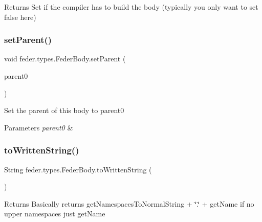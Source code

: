 \begin{DoxyReturn}{Returns}
Set if the compiler has to build the body (typically you only want to set \textquotesingle{}false\textquotesingle{} here) 
\end{DoxyReturn}
\mbox{\label{classfeder_1_1types_1_1FederBody_a0c773c1b19c9fb19e27270674ebd54e0}} 
\subsubsection{\texorpdfstring{set\+Parent()}{setParent()}}
{\footnotesize\ttfamily void feder.\+types.\+Feder\+Body.\+set\+Parent (\begin{DoxyParamCaption}\item[{\hyperlink{classfeder_1_1types_1_1FederBody}{Feder\+Body}}]{parent0 }\end{DoxyParamCaption})}

Set the parent of this body to \textquotesingle{}parent0\textquotesingle{} 
\begin{DoxyParams}{Parameters}
{\em parent0} & \\
\hline
\end{DoxyParams}
\mbox{\label{classfeder_1_1types_1_1FederBody_ab31ab3308f48585665e6367f776c1d71}} 
\subsubsection{\texorpdfstring{to\+Written\+String()}{toWrittenString()}}
{\footnotesize\ttfamily String feder.\+types.\+Feder\+Body.\+to\+Written\+String (\begin{DoxyParamCaption}{ }\end{DoxyParamCaption})}

\begin{DoxyReturn}{Returns}
Basically returns get\+Namespaces\+To\+Normal\+String + \char`\"{}.\char`\"{} + get\+Name if no upper namespaces just get\+Name 
\end{DoxyReturn}


